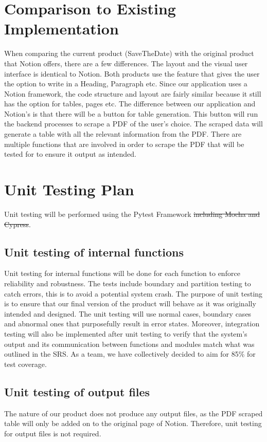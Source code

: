 \documentclass[12pt, titlepage]{article}
\begin{document}
	
\section{Comparison to Existing Implementation}

When comparing the current product (SaveTheDate) with the original product that Notion offers, there are a few differences. The layout and the visual user interface is identical to Notion. Both products use the feature that gives the user the option to write in a Heading, Paragraph etc. Since our application uses a Notion framework, the code structure and layout are fairly similar because it still has the option for tables, pages etc. The difference between our application and Notion’s is that there will be a button for table generation. This button will run the backend processes to scrape a PDF of the user’s choice. The scraped data will generate a table with all the relevant information from the PDF. There are multiple functions that are involved in order to scrape the PDF that will be tested for to ensure it output as intended. 
				
\section{Unit Testing Plan}

Unit testing will be performed using the Pytest Framework \sout{including Mocha and Cypress}.
		
\subsection{Unit testing of internal functions}
Unit testing for internal functions will be done for each function to enforce reliability and robustness. The tests include boundary and partition testing to catch errors, this is to avoid a potential system crash.  The purpose of unit testing is to ensure that our final version of the product will behave as it was originally intended and designed. The unit testing will use normal cases, boundary cases and abnormal ones that purposefully result in error states. Moreover, integration testing will also be implemented after unit testing to verify that the system’s output and its communication between functions and modules match what was outlined in the SRS. As a team, we have collectively decided to aim for 85\% for test coverage. 

\subsection{Unit testing of output files}	
The nature of our product does not produce any output files, as the PDF scraped table will only be added on to the original page of Notion. Therefore, unit testing for output files is not required. 	
\end{document}
